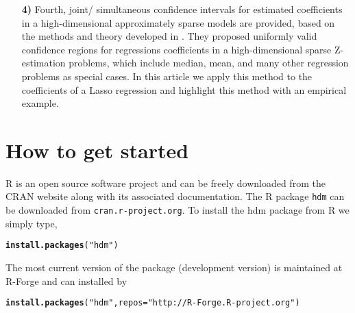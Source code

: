 \documentclass{amsart}\usepackage[]{graphicx}\usepackage[]{color}
\makeatletter
\newcommand{\hlstr}[1]{\textcolor[rgb]{0.192,0.494,0.8}{#1}}%
\newcommand{\hlstd}[1]{\textcolor[rgb]{0.345,0.345,0.345}{#1}}%
\newcommand{\hlkwc}[1]{\textcolor[rgb]{0.333,0.667,0.333}{#1}}%
\newcommand{\hlkwd}[1]{\textcolor[rgb]{0.737,0.353,0.396}{\textbf{#1}}}%
\newenvironment{kframe}{%
 \def\at@end@of@kframe{}%
 \ifinner\ifhmode%
  \def\at@end@of@kframe{\end{minipage}}%
  \begin{minipage}{\columnwidth}%
 \fi\fi%
 \def\FrameCommand##1{\hskip\@totalleftmargin \hskip-\fboxsep
 \colorbox{shadecolor}{##1}\hskip-\fboxsep
     \hskip-\linewidth \hskip-\@totalleftmargin \hskip\columnwidth}%
 \MakeFramed {\advance\hsize-\width
   \@totalleftmargin\z@ \linewidth\hsize
   \@setminipage}}%
 {\par\unskip\endMakeFramed%
 \at@end@of@kframe}
\newenvironment{knitrout}{}{} %
\newcommand{\Rpackage}[1]{{\texttt{#1}}}
\newcommand{\R}{{\normalfont\textsf{R }}{}}
\makeatother
\begin{document}
\begin{itemize}
\item[\textbf{4)}] Fourth, joint/ simultaneous confidence intervals for estimated coefficients in a  high-dimensional approximately sparse models are provided, based on the methods and theory developed in \cite{BCK2014}. They proposed uniformly valid confidence regions for regressions coefficients in a high-dimensional sparse Z-estimation problems, which include median, mean, and many other regression problems as special cases. In this article we apply this method to the coefficients of a Lasso regression and highlight this method with an empirical example.

\end{itemize}




\section{How to get started}
\R is an open source software project and can be freely downloaded from the CRAN
website along with its associated documentation. The \R package \Rpackage{hdm} can be downloaded from \texttt{cran.r-project.org}. To install the hdm package from \R we simply type,



\begin{knitrout}
\color{fgcolor}\begin{kframe}
\begin{alltt}
\hlkwd{install.packages}\hlstd{(}\hlstr{"hdm"}\hlstd{)}
\end{alltt}
\end{kframe}
\end{knitrout}

\noindent
The most current version of the package (development version) is maintained at R-Forge and can installed by

\begin{knitrout}
\color{fgcolor}\begin{kframe}
\begin{alltt}
\hlkwd{install.packages}\hlstd{(}\hlstr{"hdm"}\hlstd{,} \hlkwc{repos} \hlstd{=} \hlstr{"http://R-Forge.R-project.org"}\hlstd{)}
\end{alltt}
\end{kframe}
\end{knitrout}
\end{document}
